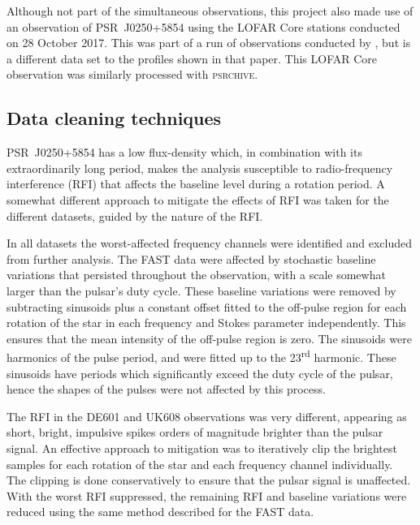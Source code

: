 Although not part of the simultaneous observations, this project also made use of an observation of PSR~J0250+5854 using the LOFAR Core stations \citep{HWG+2013} conducted on 28 October 2017. This was part of a run of observations conducted by \citet{TBC+2018}, but is a different data set to the profiles shown in that paper. This LOFAR Core observation was similarly processed with \textsc{psrchive}.

\subsection{Data cleaning techniques}
\label{sec: J0250 - observations - cleaning}

PSR~J0250+5854 has a low flux-density which, in combination with its extraordinarily long period, makes the analysis susceptible to radio-frequency interference (RFI) that affects the baseline level during a rotation period. A somewhat different approach to mitigate the effects of RFI was taken for the different datasets, guided by the nature of the RFI.

In all datasets the worst-affected frequency channels were identified and excluded from further analysis. The FAST data were affected by stochastic baseline variations that persisted throughout the observation, with a scale somewhat larger than the pulsar's duty cycle. These baseline variations were removed by subtracting sinusoids plus a constant offset fitted to the off-pulse region for each rotation of the star in each frequency and Stokes parameter independently. This ensures that the mean intensity of the off-pulse region is zero.  The sinusoids were harmonics of the pulse period, and were fitted up to the 23\textsuperscript{rd} harmonic. These sinusoids have periods which significantly exceed the duty cycle of the pulsar, hence the shapes of the pulses were not affected by this process.

The RFI in the DE601 and UK608 observations was very different, appearing as short, bright, impulsive spikes orders of magnitude brighter than the pulsar signal. An effective approach to mitigation was to iteratively clip the brightest samples for each rotation of the star and each frequency channel individually. The clipping is done conservatively to ensure that the pulsar signal is unaffected. With the worst RFI suppressed, the remaining RFI and baseline variations were reduced using the same method described for the FAST data.

